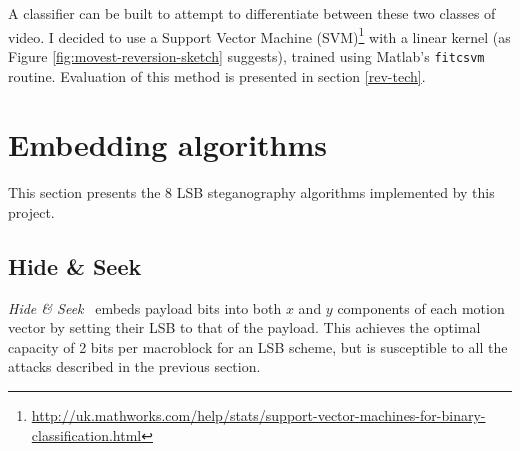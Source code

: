 \documentclass[12pt,british,twoside,notitlepage,usenames,dvipsnames,hypens,final]{report}
\numberwithin{equation}{section}
\numberwithin{figure}{section}
\begin{document}
A classifier can be built to attempt to differentiate between these two classes of video. I decided to use a Support Vector Machine (SVM)\footnote{\url{http://uk.mathworks.com/help/stats/support-vector-machines-for-binary-classification.html}} with a linear kernel (as Figure \ref{fig:movest-reversion-sketch} suggests), trained using Matlab's \texttt{fitcsvm} routine. Evaluation of this method is presented in section \ref{rev-tech}.

\section{Embedding algorithms}
\label{emb-alg}

This section presents the 8 LSB steganography algorithms implemented by this project.

\subsection{Hide \& Seek}
\label{hide-n-seek}

\emph{Hide \& Seek}~\cite{bateman} embeds payload bits into both $x$ and $y$ components of each motion vector by setting their LSB to that of the payload. This achieves the optimal capacity of 2 bits per macroblock for an LSB scheme, but is susceptible to all the attacks described in the previous section.
\end{document}

